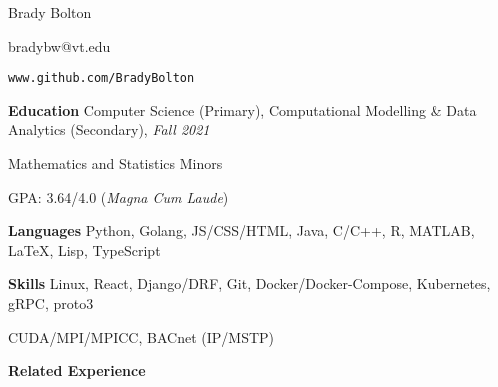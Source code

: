 \documentclass{article}
\newcommand{\code}[1]{\texttt{#1}} %
\begin{document}
	\begin{center}
	
		\huge{Brady Bolton}
		
		\large{bradybw@vt.edu}

		\large{\code{www.github.com/BradyBolton}}
	
	\end{center}

\vline

\textbf{\large{Education}} \quad Computer Science (Primary), Computational Modelling \& Data Analytics (Secondary), \textit{Fall 2021}

\qquad \qquad \qquad \hspace{10pt} Mathematics and Statistics Minors

\qquad \qquad \qquad \hspace{10pt} GPA: 3.64/4.0 (\textit{Magna Cum Laude})

\vline

\textbf{\large{Languages}} \quad Python, Golang, JS/CSS/HTML, Java, C/C++, R, MATLAB, \LaTeX, Lisp, TypeScript

\textbf{\large{Skills}} \qquad \qquad Linux, React, Django/DRF, Git, Docker/Docker-Compose, Kubernetes, gRPC, proto3 

\qquad \qquad \qquad \hspace{10pt} CUDA/MPI/MPICC,  BACnet (IP/MSTP)

\vline

\textbf{\large{Related Experience}} 

\vspace{5pt}
\end{document}
